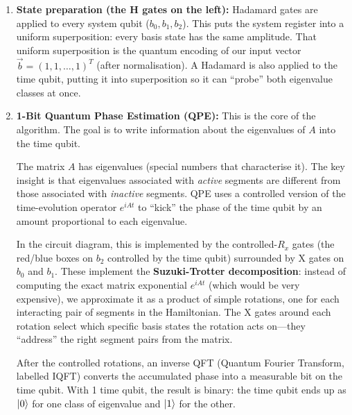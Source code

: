 \documentclass[11pt, a4paper]{article}
\begin{document}
\begin{enumerate}
    \item \textbf{State preparation (the H gates on the left):}
          Hadamard gates are applied to every system qubit ($b_0, b_1,
          b_2$). This puts the system register into a uniform
          superposition: every basis state has the same amplitude. That
          uniform superposition is the quantum encoding of our input vector
          $\vec{b} = (1, 1, \ldots, 1)^T$ (after normalisation). A
          Hadamard is also applied to the time qubit, putting it into
          superposition so it can ``probe'' both eigenvalue classes at once.

    \item \textbf{1-Bit Quantum Phase Estimation (QPE):}
          This is the core of the algorithm. The goal is to write
          information about the eigenvalues of $A$ into the time qubit.

          The matrix $A$ has eigenvalues (special numbers that characterise
          it). The key insight is that eigenvalues associated with
          \emph{active} segments are different from those associated with
          \emph{inactive} segments. QPE uses a controlled version of the
          time-evolution operator $e^{iAt}$ to ``kick'' the phase of the
          time qubit by an amount proportional to each eigenvalue.

          In the circuit diagram, this is implemented by the
          controlled-$R_x$ gates (the red/blue boxes on $b_2$ controlled
          by the time qubit) surrounded by X gates on $b_0$ and $b_1$.
          These implement the \textbf{Suzuki-Trotter decomposition}: instead
          of computing the exact matrix exponential $e^{iAt}$ (which would
          be very expensive), we approximate it as a product of simple
          rotations, one for each interacting pair of segments in the
          Hamiltonian. The X gates around each rotation select which
          specific basis states the rotation acts on---they ``address'' the
          right segment pairs from the matrix.

          After the controlled rotations, an inverse QFT (Quantum Fourier
          Transform, labelled IQFT) converts the accumulated phase into a
          measurable bit on the time qubit. With 1 time qubit, the result
          is binary: the time qubit ends up as $\ket{0}$ for one class of
          eigenvalue and $\ket{1}$ for the other.


\end{enumerate}
\end{document}

